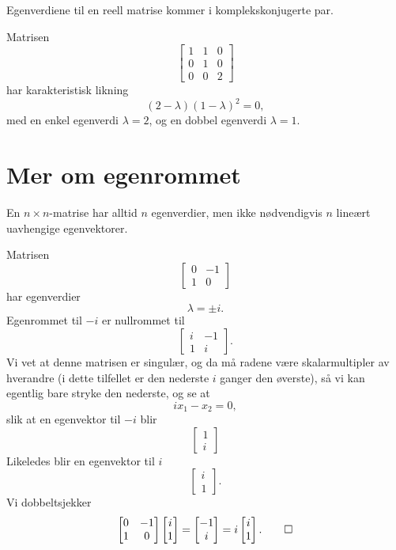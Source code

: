 \begin{thm}
Egenverdiene til en reell matrise kommer i komplekskonjugerte par.
\end{thm}


\begin{ex}
Matrisen
\[
\begin{bmatrix}
1 & 1 & 0\\  0 &1 & 0 \\ 0 & 0 & 2
\end{bmatrix}
\]
har karakteristisk likning
\[
(2-\lambda)(1-\lambda)^2=0,
\]
med en enkel egenverdi $\lambda=2$, og en dobbel egenverdi $\lambda=1$. 
\end{ex}


\section*{Mer om egenrommet}
En $n \times n$-matrise har alltid $n$ egenverdier, 
men ikke nødvendigvis $n$ lineært uavhengige egenvektorer.

\begin{ex}
Matrisen
\[
\begin{bmatrix}
0 & -1 \\ 1 &0
\end{bmatrix}
\]
har egenverdier
\[
\lambda=\pm i.
\] 
Egenrommet til $-i$ er nullrommet til 
\[
\begin{bmatrix}
i & -1 \\ 1 &i
\end{bmatrix}.
\]
Vi vet at denne matrisen er singulær, 
og da må radene være skalarmultipler av hverandre (i dette tilfellet er den nederste $i$ ganger den øverste), 
så vi kan egentlig bare stryke den nederste, og se at
\[
ix_1-x_2=0,
\]
slik at en egenvektor til $-i$ blir
\[
\begin{bmatrix}
1  \\ i
\end{bmatrix}
\]
Likeledes blir en egenvektor til $i$ 
\[
\begin{bmatrix}
i  \\ 1
\end{bmatrix}.
\]
Vi dobbeltsjekker
\[
\begin{bmatrix}
0 & -1 \\ 1 &0
\end{bmatrix}
\begin{bmatrix}
i  \\ 1
\end{bmatrix}
=
\begin{bmatrix}
-1  \\ i
\end{bmatrix}
=
i
\begin{bmatrix}
i  \\ 1
\end{bmatrix}.\qedhere
\]
\end{ex}

